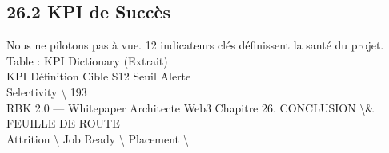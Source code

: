 \documentclass[12pt,landscape,a4paper]{article}
\begin{document}
\subsection{26.2 KPI de Succès}
Nous ne pilotons pas à vue. 12 indicateurs clés définissent la santé du projet.\\
\vspace{0.5em}
Table : KPI Dictionary (Extrait)\\
\vspace{0.5em}
KPI         Définition                Cible S12 Seuil Alerte\\
Selectivity \textbackslash{}%
\vspace{0.5em}
\vspace{0.5em}
\vspace{0.5em}
\vspace{0.5em}
193\\
RBK 2.0 — Whitepaper Architecte Web3                                                       Chapitre 26. CONCLUSION \textbackslash{}& FEUILLE DE ROUTE\\
\vspace{0.5em}
\vspace{0.5em}
\vspace{0.5em}
Attrition \textbackslash{}%
Job Ready \textbackslash{}%
Placement \textbackslash{}%
\vspace{0.5em}
\vspace{0.5em}
\vspace{0.5em}
\end{document}
